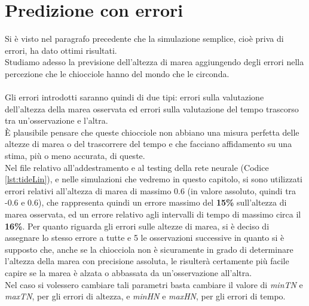 \chapter{Predizione con errori}
	Si è visto nel paragrafo precedente che la simulazione semplice, cioè priva di errori, ha dato ottimi risultati.\\
	Studiamo adesso la previsione dell'altezza di marea aggiungendo degli errori nella percezione che le chiocciole hanno del mondo che le circonda.\\
	\\
	Gli errori introdotti saranno quindi di due tipi: errori sulla valutazione dell'altezza della marea osservata ed errori sulla valutazione del tempo trascorso tra un'osservazione e l'altra.\\
	È plausibile pensare che queste chiocciole non abbiano una misura perfetta delle altezze di marea o del trascorrere del tempo e che facciano affidamento su una stima, più o meno accurata, di queste.\\
	Nel file relativo all'addestramento e al testing della rete neurale (Codice \ref{lst:tideLin}), e nelle simulazioni che vedremo in questo capitolo, si sono utilizzati errori relativi all'altezza di marea di massimo 0.6 (in valore assoluto, quindi tra -0.6 e 0.6), che rappresenta quindi un errore massimo del \textbf{15\%} sull'altezza di marea osservata, ed un errore relativo agli intervalli di tempo di massimo circa il \textbf{16\%}. Per quanto riguarda gli errori sulle altezze di marea, si è deciso di assegnare lo stesso errore a tutte e 5 le osservazioni successive in quanto si è supposto che, anche se la chiocciola non è sicuramente in grado di determinare l'altezza della marea con precisione assoluta, le risulterà certamente più facile capire se la marea è alzata o abbassata da un'osservazione all'altra.\\
	Nel caso si volessero cambiare tali parametri basta cambiare il valore di \textit{minTN} e \textit{maxTN}, per gli errori di altezza, e \textit{minHN} e \textit{maxHN}, per gli errori di tempo.
